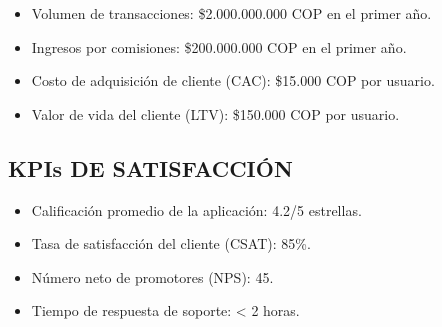 \documentclass[12pt,a4paper]{article}
\newcommand{\subsectiontitle}[1]{\subsection{#1}}
\begin{document}
\begin{itemize}
    \item Volumen de transacciones: \$2.000.000.000 COP en el primer año.
    \item Ingresos por comisiones: \$200.000.000 COP en el primer año.
    \item Costo de adquisición de cliente (CAC): \$15.000 COP por usuario.
    \item Valor de vida del cliente (LTV): \$150.000 COP por usuario.
\end{itemize}

\subsectiontitle{KPIs DE SATISFACCIÓN}

\begin{itemize}
    \item Calificación promedio de la aplicación: 4.2/5 estrellas.
    \item Tasa de satisfacción del cliente (CSAT): 85\%.
    \item Número neto de promotores (NPS): 45.
    \item Tiempo de respuesta de soporte: < 2 horas.
\end{itemize}
\end{document}
